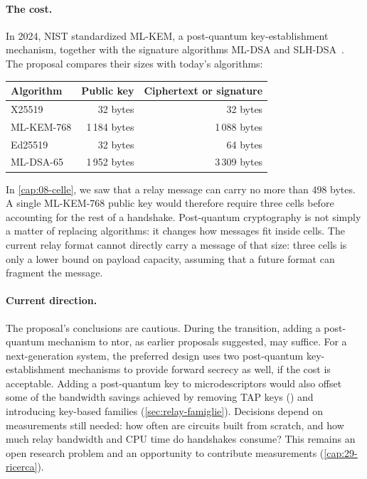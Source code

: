 \paragraph{The cost.} In 2024, NIST standardized ML-KEM, a post-quantum key-establishment mechanism, together with the signature algorithms ML-DSA and SLH-DSA~\cite{nistpqc2024}. The proposal compares their sizes with today's algorithms:
\begin{center}\small
\begin{tabular}{@{}lrr@{}}
\toprule
Algorithm & Public key & Ciphertext or signature \\
\midrule
X25519 & 32 bytes & 32 bytes \\
ML-KEM-768 & 1\,184 bytes & 1\,088 bytes \\
Ed25519 & 32 bytes & 64 bytes \\
ML-DSA-65 & 1\,952 bytes & 3\,309 bytes \\
\bottomrule
\end{tabular}
\end{center}
In \cref{cap:08-celle}, we saw that a relay message can carry no more than 498 bytes. A single ML-KEM-768 public key would therefore require three cells before accounting for the rest of a handshake. Post-quantum cryptography is not simply a matter of replacing algorithms: it changes how messages fit inside cells. The current relay format cannot directly carry a message of that size: three cells is only a lower bound on payload capacity, assuming that a future format can fragment the message.

\paragraph{Current direction.} The proposal's conclusions are cautious. During the transition, adding a post-quantum mechanism to ntor, as earlier proposals suggested, may suffice. For a next-generation system, the preferred design uses two post-quantum key-establishment mechanisms to provide forward secrecy as well, if the cost is acceptable. Adding a post-quantum key to microdescriptors would also offset some of the bandwidth savings achieved by removing TAP keys () and introducing key-based families (\cref{sec:relay-famiglie}). Decisions depend on measurements still needed: how often are circuits built from scratch, and how much relay bandwidth and CPU time do handshakes consume? This remains an open research problem and an opportunity to contribute measurements (\cref{cap:29-ricerca}).

